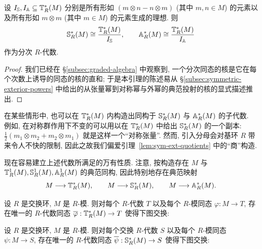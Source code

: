 \begin{lemma}\label{lem:sym-ext-quotients}
设 $I_{\mathbb{S}},I_{\mathbb{A}}\subseteq\mathbb{T}_R^*(M)$ 分别是所有形如 $(m\otimes n-n\otimes m)$ (其中 $m,n\in M$) 的元素以及所有形如 $m\otimes m$ (其中 $m\in M$) 的元素生成的理想. 则
\[
\mathbb{S}_R^*(M)\cong\frac{\mathbb{T}_R^*(M)}{I_{\mathbb{S}}},\qquad
\mathbb{A}_R^*(M)\cong\frac{\mathbb{T}_R^*(M)}{I_{\mathbb{A}}}
\]
作为分次 $R$-代数.
\end{lemma}

\begin{proof}
我们已经在 \S\ref{subsec:graded-algebra} 中观察到, 一个分次同态的核是它在每个次数上诱导的同态的核的直和; 于是本引理的陈述易从 §\ref{subsec:symmetric-exterior-powers} 中给出的从张量幂到对称幂与外幂的典范投射的核的显式描述推出.
\end{proof}

\begin{remark}\label{rmk:sym-invariant-quotient}
在某些情形中, 也可以在 $\mathbb{T}_R^*(M)$ 内构造出同构于 $\mathbb{S}_R^*(M)$ 与 $\mathbb{A}_R^*(M)$ 的子代数. 例如, 在对称群作用下不变的可以用以在 $\mathbb{T}_R^*(M)$ 中给出 $\mathbb{S}_R^*(M)$ 的一个副本: $\frac12(m_1\otimes m_2+m_2\otimes m_1)$ 就是这样一个``对称张量''. 然而, 引入分母会对基环 $R$ 带来令人不快的限制, 因此之故我们偏爱引理~\ref{lem:sym-ext-quotients} 中的``商''构造.
\end{remark}

现在容易建立上述代数所满足的万有性质. 注意, 按构造存在 $M$ 与 $\mathbb{T}_R^1(M),\mathbb{S}_R^1(M),\mathbb{A}_R^1(M)$ 的典范同构, 因此特别地存在典范映射
\[
M\longrightarrow\mathbb{T}_R^*(M),\qquad
M\longrightarrow\mathbb{S}_R^*(M),\qquad
M\longrightarrow\mathbb{A}_R^*(M).
\]

\begin{proposition}\label{prop:tensor-algebra-univ}
设 $R$ 是交换环, $M$ 是 $R$-模. 则对每个 $R$-代数 $T$ 以及每个 $R$-模同态 $\varphi:M\to T$, 存在唯一的 $R$-代数同态 $\overline{\varphi}:\mathbb{T}_R^*(M)\to T$ 使得下图交换:
\begin{center}
\end{center}
\end{proposition}

\begin{proposition}\label{prop:sym-algebra-univ}
设 $R$ 是交换环, $M$ 是 $R$-模. 则对每个交换 $R$-代数 $S$ 以及每个 $R$-模同态 $\psi:M\to S$, 存在唯一的 $R$-代数同态 $\overline{\psi}:\mathbb{S}_R^*(M)\to S$ 使得下图交换:
\begin{center}
\end{center}
\end{proposition}

